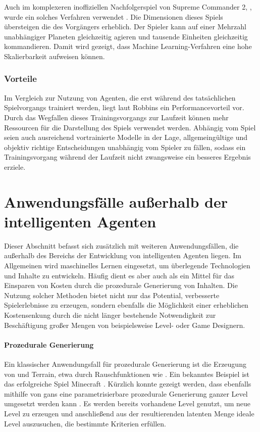 Auch im komplexeren inoffiziellen Nachfolgerspiel von Supreme Commander 2,  \cite{pa_game}, wurde ein solches Verfahren verwendet \cite{pa_game_forum}. Die Dimensionen dieses Spiels übersteigen die des Vorgängers erheblich. Der Spieler kann auf einer Mehrzahl unabhängiger Planeten gleichzeitig agieren und tausende Einheiten gleichzeitig kommandieren. Damit wird gezeigt, dass Machine Learning-Verfahren eine hohe Skalierbarkeit aufweisen können.

\subsubsection{Vorteile}
Im Vergleich zur Nutzung von Agenten, die erst während des tatsächlichen Spielvorgangs trainiert werden, liegt laut Robbins ein Performancevorteil vor. Durch das Wegfallen dieses Trainingsvorgangs zur Laufzeit können mehr Ressourcen für die Darstellung des Spiels verwendet werden. Abhängig vom Spiel seien auch ausreichend vortrainierte Modelle in der Lage, allgemeingültige und objektiv richtige Entscheidungen unabhängig vom Spieler zu fällen, sodass ein Trainingsvorgang während der Laufzeit nicht zwangsweise ein besseres Ergebnis erziele.



\section{Anwendungsfälle außerhalb der intelligenten Agenten}
Dieser Abschnitt befasst sich zusätzlich mit weiteren Anwendungsfällen, die außerhalb des Bereichs der Entwicklung von intelligenten Agenten liegen. Im Allgemeinen wird maschinelles Lernen eingesetzt, um überlegende Technologien und Inhalte zu entwickeln. Häufig dient es aber auch als ein Mittel für das Einsparen von Kosten durch die prozedurale Generierung von Inhalten. Die Nutzung solcher Methoden bietet nicht nur das Potential, verbesserte Spielerlebnisse zu erzeugen, sondern ebenfalls die Möglichkeit einer erheblichen Kostensenkung durch die nicht länger bestehende Notwendigkeit zur Beschäftigung großer Mengen von beispielsweise Level- oder Game Designern.

\paragraph{Prozedurale Generierung}
Ein klassischer Anwendungsfall für prozedurale Generierung ist die Erzeugung von  und Terrain, etwa durch Rauschfunktionen wie  \cite{minecraft_perlin} \cite{ml_procedural_article}. Ein bekanntes Beispiel ist das erfolgreiche Spiel Minecraft \cite{minecraft}. Kürzlich konnte gezeigt werden, dass ebenfalls mithilfe von \acp{gan} eine parametrisierbare prozedurale Generierung ganzer Level umgesetzt werden kann \cite{mario_pcg}. Es werden bereits vorhandene Level genutzt, um neue Level zu erzeugen und anschließend aus der resultierenden latenten Menge ideale Level auszusuchen, die bestimmte Kriterien erfüllen.

